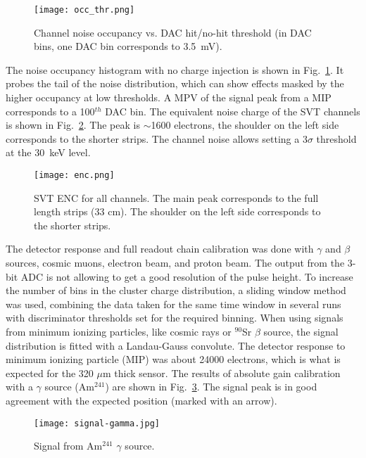 \begin{figure}[hbt] 
\centering 
\texttt{[image: occ\_thr.png]}
\caption{Channel noise occupancy vs. DAC hit/no-hit threshold (in DAC bins, one DAC bin corresponds to 3.5~mV).}
\label{fig:noiseocc}
\end{figure}

The noise occupancy histogram with no charge injection is shown in Fig.~\ref{fig:noiseocc}. It probes the tail of the noise distribution, which can show effects masked by the higher occupancy at low thresholds. A MPV of the signal peak from a MIP corresponds to a 100$^{th}$ DAC bin. The equivalent noise charge of the SVT channels is shown in  Fig.~\ref{fig:enc}. The peak is $\sim$1600 electrons, the shoulder on the left side corresponds to the shorter strips. The channel noise allows setting a 3$\sigma$ threshold at the 30~keV level. 

\begin{figure}[hbt] 
	\centering 
	\texttt{[image: enc.png]}
	\caption{SVT ENC for all channels. The main peak corresponds to the full length strips (33 cm). The shoulder on the left side corresponds to the shorter strips.}
	\label{fig:enc}
\end{figure}

The detector response and full readout chain calibration was done with $\gamma$ and $\beta$ sources, cosmic muons, electron beam, and proton beam. The output from the 3-bit ADC is not allowing to get a good resolution of the pulse height. To increase the number of bins in the cluster charge distribution, a sliding window method was used, combining the data taken for the same time window in several runs with discriminator thresholds set for the required binning. When using signals from minimum ionizing particles, like cosmic rays or $^{90}$Sr $\beta$ source, the signal distribution is fitted with a Landau-Gauss convolute. The detector response to minimum ionizing particle (MIP) was about 24000 electrons, which is what is expected for the 320 $\mu$m thick sensor. The results of absolute gain calibration with a $\gamma$ source (Am$^{241}$) are shown in Fig.~\ref{fig:signal-gamma}. The signal peak is in good agreement with the expected position (marked with an arrow). 

\begin{figure}[hbt] 
	\centering 
	\texttt{[image: signal-gamma.jpg]}
	\caption{Signal from Am$^{241}$ $\gamma$ source.}
	\label{fig:signal-gamma}
\end{figure}


